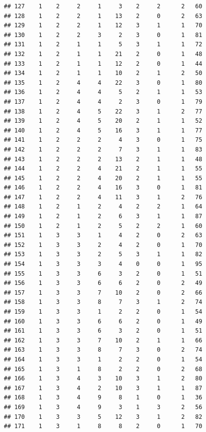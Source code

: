 \documentclass[krantz2]{krantz}\usepackage{knitr}%
\begin{document}
\begin{knitrout}
\begin{kframe}
\begin{verbatim}
## 127    1    2     2     1     3    2     2      2   60
## 128    1    2     2     1    13    2     0      2   63
## 129    1    2     2     1    12    3     1      1   70
## 130    1    2     2     3     2    3     0      1   81
## 131    1    2     1     1     5    3     1      1   72
## 132    1    2     1     1    21    2     0      1   48
## 133    1    2     1     1    12    2     0      1   44
## 134    1    2     1     1    10    2     1      2   50
## 135    1    2     4     4    22    3     0      1   80
## 136    1    2     4     4     5    2     1      1   53
## 137    1    2     4     4     2    3     0      1   79
## 138    1    2     4     5    22    3     1      2   77
## 139    1    2     4     5    20    2     1      1   52
## 140    1    2     4     5    16    3     1      1   77
## 141    1    2     2     2     4    3     0      1   75
## 142    1    2     2     2     7    3     1      1   83
## 143    1    2     2     2    13    2     1      1   48
## 144    1    2     2     4    21    2     1      1   55
## 145    1    2     2     4    20    2     1      1   55
## 146    1    2     2     4    16    3     0      1   81
## 147    1    2     2     4    11    3     1      2   76
## 148    1    2     1     2     4    2     2      1   64
## 149    1    2     1     2     6    3     1      1   87
## 150    1    2     1     2     5    2     2      1   60
## 151    1    3     3     1     4    2     0      2   63
## 152    1    3     3     2     4    2     0      1   70
## 153    1    3     3     2     5    3     1      1   82
## 154    1    3     3     3     4    0     0      1   95
## 155    1    3     3     6     3    2     0      1   51
## 156    1    3     3     6     6    2     0      2   49
## 157    1    3     3     7    10    2     0      2   66
## 158    1    3     3     8     7    3     1      2   74
## 159    1    3     3     1     2    2     0      1   54
## 160    1    3     3     6     6    2     0      1   49
## 161    1    3     3     6     3    2     0      1   51
## 162    1    3     3     7    10    2     1      1   66
## 163    1    3     3     8     7    3     0      2   74
## 164    1    3     3     1     2    2     0      1   54
## 165    1    3     1     8     2    2     0      2   68
## 166    1    3     4     3    10    3     1      2   80
## 167    1    3     4     2    10    3     1      1   87
## 168    1    3     4     9     8    1     0      1   36
## 169    1    3     4     9     3    1     3      2   56
## 170    1    3     3     5    12    3     1      2   82
## 171    1    3     1     8     8    2     0      1   70

\end{verbatim}
\end{kframe}
\end{knitrout}
\end{document}
